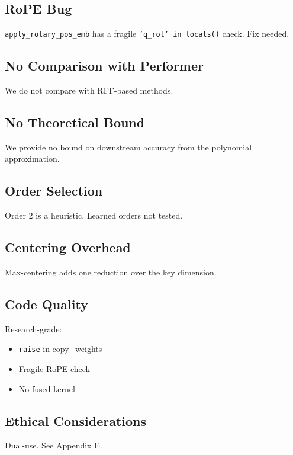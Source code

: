 \subsection{RoPE Bug}

\texttt{apply\_rotary\_pos\_emb} has a fragile \texttt{'q\_rot' in locals()} check. Fix needed.

\subsection{No Comparison with Performer}

We do not compare with RFF-based methods.

\subsection{No Theoretical Bound}

We provide no bound on downstream accuracy from the polynomial approximation.

\subsection{Order Selection}

Order 2 is a heuristic. Learned orders not tested.

\subsection{Centering Overhead}

Max-centering adds one reduction over the key dimension.

\subsection{Code Quality}

Research-grade:
\begin{itemize}
\item \texttt{raise} in copy\_weights
\item Fragile RoPE check
\item No fused kernel

\end{itemize}
\subsection{Ethical Considerations}

Dual-use. See Appendix E.

